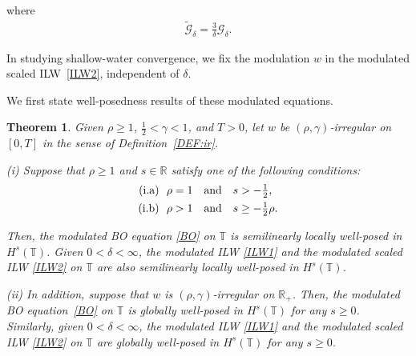 \documentclass[letterpaper, 11pt,  reqno]{amsart}
\newtheorem{theorem}{Theorem} [section]
\newcommand{\1}{\hspace{0.5mm}\text{I}\hspace{0.5mm}}
\newcommand{\noi}{\noindent}
\newcommand{\R}{\mathbb{R}}
\newcommand{\T}{\mathbb{T}}
\newcommand{\dl}{\delta}
\newcommand{\g}{\gamma}
\newcommand{\wt}{\widetilde}
\newcommand{\Gdl}{\mathcal{G}_{\dl} }
\newcommand{\Gd}{\wt{\mathcal{G}}_\dl}
\numberwithin{equation}{section}
\numberwithin{theorem}{section}
\begin{document}
\noi
where 
\begin{align}
 \Gd = \frac{3}{\dl} \Gdl.
\label{GG2}
\end{align}


\noi
In studying shallow-water convergence, 
we fix the modulation $w$ in the modulated scaled ILW~\eqref{ILW2}, 
independent of $\dl$.



We first state well-posedness results
of these modulated equations.






\begin{theorem}
\label{THM:4}
Given $\rho \ge  1$, $\frac12< \g < 1$, and $T > 0$, 
let  $w$ be $(\rho,\g)$-irregular on $[0, T]$ in the sense of Definition~\ref{DEF:ir}.

\smallskip

\noi
\textup{(i)}
Suppose that $\rho \ge 1$ and $s\in \R$
satisfy one of the following conditions\textup{:}
\begin{align}
\begin{split}
\textup{(i.a)} &\ \   \rho =  1 \quad \text{and} \quad s > - \tfrac 12, \\
\textup{(i.b)} &\ \  \rho >  1 \quad  \text{and} \quad  s \ge - \tfrac 12 \rho.
\end{split}
\label{regBO1}
\end{align}

\noi
Then, the modulated BO equation \eqref{BO}
on  $\T$
is semilinearly  locally well-posed in $H^s(\T)$.
Given $0 < \dl < \infty$, 
the modulated 
ILW \eqref{ILW1}
and
the modulated 
scaled ILW \eqref{ILW2}
on  $\T$
are also semilinearly  locally well-posed in $H^s(\T)$.




\smallskip


\noi
\textup{(ii)}
In addition, suppose that 
  $w$ is $(\rho,\g)$-irregular on $\R_+$.
Then, the modulated BO equation~\eqref{BO} 
on $\T$ is globally well-posed in $H^s(\T)$ for any $s \ge 0$.
Similarly, 
given $0 < \dl < \infty$, 
the modulated 
ILW \eqref{ILW1}
and
the modulated 
scaled ILW \eqref{ILW2}
on $\T$ are globally well-posed in $H^s(\T)$ for any $s \ge 0$.



\end{theorem}
\end{document}
